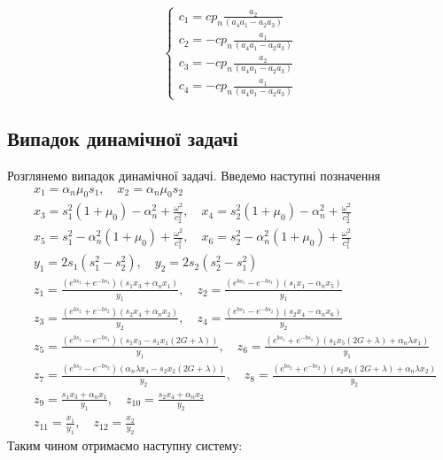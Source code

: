 \begin{equation*}
    \begin{cases}
        c_1 = c p_n \frac{a_2}{(a_4 a_1 - a_2 a_3)} \\
        c_2 = - c p_n \frac{a_1}{(a_4 a_1 - a_2 a_3)} \\
        c_3 = -c p_n \frac{a_2}{(a_4 a_1 - a_2 a_3)} \\
        c_4 = - c p_n \frac{a_1}{(a_4 a_1 - a_2 a_3)}
    \end{cases}
\end{equation*}

\subsection*{Випадок динамічної задачі}
Розглянемо випадок динамічної задачі. Введемо наступні позначення
\begin{align*}
    &x_1 = \alpha_n \mu_0 s_1, \quad x_2 = \alpha_n \mu_0 s_2 \\
    &x_3 = s_1^2(1 + \mu_0) - \alpha_n^2 + \frac{\omega^2}{c_2^2}, \quad x_4 = s_2^2(1 + \mu_0) - \alpha_n^2 + \frac{\omega^2}{c_2^2} \\
    &x_5 = s_1^2 - \alpha_n^2(1 + \mu_0) + \frac{\omega^2}{c_1^2}, \quad x_6 = s_2^2 - \alpha_n^2(1 + \mu_0) + \frac{\omega^2}{c_1^2} \\
    &y_1 = 2s_1 (s_1^2 - s_2^2), \quad y_2 = 2 s_2 (s_2^2 - s_1^2) \\
    &z_1 = \frac{(e^{b s_1} + e^{-b s_1}) (s_1 x_3 + \alpha_n x_1)}{y_1}, \quad z_2 = \frac{(e^{b s_1} - e^{-b s_1}) (s_1 x_1 - \alpha_n x_5)}{y_1} \\
    &z_3 = \frac{(e^{b s_2} + e^{-b s_2}) (s_2 x_4 + \alpha_n x_2)}{y_2}, \quad z_4 = \frac{(e^{b s_2} - e^{-b s_2}) (s_2 x_4 - \alpha_n x_6)}{y_2} \\
    &z_5 = \frac{(e^{b s_1} - e^{-b s_1}) (s_1 x_3 - s_1 x_1 (2G + \lambda))}{y_1}, \quad z_6 = \frac{(e^{b s_1} + e^{-b s_1}) (s_1 x_5 (2G + \lambda) + \alpha_n \lambda x_1)}{y_1} \\
    &z_7 = \frac{(e^{b s_2} - e^{-b s_2}) (\alpha_n \lambda x_4 - s_2 x_2 (2G + \lambda))}{y_2}, \quad z_8 = \frac{(e^{b s_2} + e^{-b s_2}) (s_2 x_6 (2G + \lambda) + \alpha_n \lambda x_2)}{y_2} \\
    &z_9 = \frac{s_1 x_3 + \alpha_n x_1}{y_1}, \quad z_{10} = \frac{s_2 x_4 + \alpha_n x_2}{y_2} \\
    &z_{11} = \frac{x_1}{y_1}, \quad z_{12} = \frac{x_2}{y_2}
\end{align*}
Таким чином отримаємо наступну систему:
